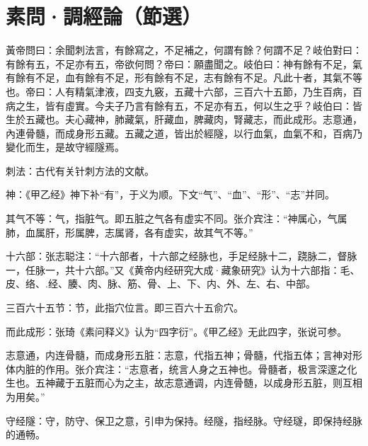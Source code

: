 \documentclass[draft,12pt]{ctexbook}
\begin{document}
\section{素問·調經論（節選）}%


\begin{yuanwen}
黃帝問曰：余聞刺法言，有餘寫之，不足補之，何謂有餘？何謂不足？岐伯對曰：有餘有五，不足亦有五，帝欲何問？帝曰：願盡聞之。岐伯曰：神有餘有不足，氣有餘有不足，血有餘有不足，形有餘有不足，志有餘有不足。凡此十者，其氣不等也。帝曰：人有精氣津液，四支九竅，五藏十六部，三百六十五節，乃生百病，百病之生，皆有虛實。今夫子乃言有餘有五，不足亦有五，何以生之乎？岐伯曰：皆生於五藏也。夫心藏神，肺藏氣，肝藏血，脾藏肉，腎藏志，而此成形。志意通，內連骨髓，而成身形五藏。五藏之道，皆出於經隧，以行血氣，血氣不和，百病乃變化而生，是故守經隧焉。
\end{yuanwen}


\begin{jiaozhu}
  \item 刺法：古代有关针刺方法的文献。
  \item 神：《甲乙经》神下补“有”，于义为顺。下文“气”、“血”、“形”、“志”并同。
  \item 其气不等：气，指脏气。即五脏之气各有虚实不同。张介宾注：“神属心，气属肺，血属肝，形属脾，志属肾，各有虚实，故其气不等。”
  \item 十六部：张志聪注：“十六部者，十六部之经脉也，手足经脉十二，跷脉二，督脉一，任脉一，共十六部。”又《黄帝内经研究大成·藏象研究》认为十六部指：毛、皮、络、.经、腠、肉、脉、筋、骨、上、下、内、外、左、右、中部。
  \item 三百六十五节：节，此指穴位言。即三百六十五俞穴。
  \item 而此成形：张琦《素问释义》认为“四字衍”。《甲乙经》无此四字，张说可参。
  \item 志意通，内连骨髓，而成身形五脏：志意，代指五神；骨髓，代指五体；言神对形体内脏的作用。张介宾注：“志意者，统言人身之五神也。骨髓者，极言深邃之化生也。五神藏于五脏而心为之主，故志意通调，内连骨髄，以成身形五脏，则互相为用矣。”
  \item 守经隧：守，防守、保卫之意，引申为保持。经隧，指经脉。守经璲，即保持经脉的通畅。
\end{jiaozhu}


\end{document}
